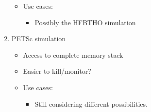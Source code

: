 \documentclass{article}
\begin{document}
\begin{enumerate}
\begin{itemize}
      \item Use cases: 
        \begin{itemize}
          \item Possibly the HFBTHO simulation 
        \end{itemize}
    \end{itemize}
  \item PETSc simulation 
    \begin{itemize}
      \item Access to complete memory stack
      \item Easier to kill/monitor?
      \item Use cases: 
        \begin{itemize}
          \item Still considering different possibilities.
        \end{itemize}
    \end{itemize}
\end{enumerate}


\clearpage
\end{document}
